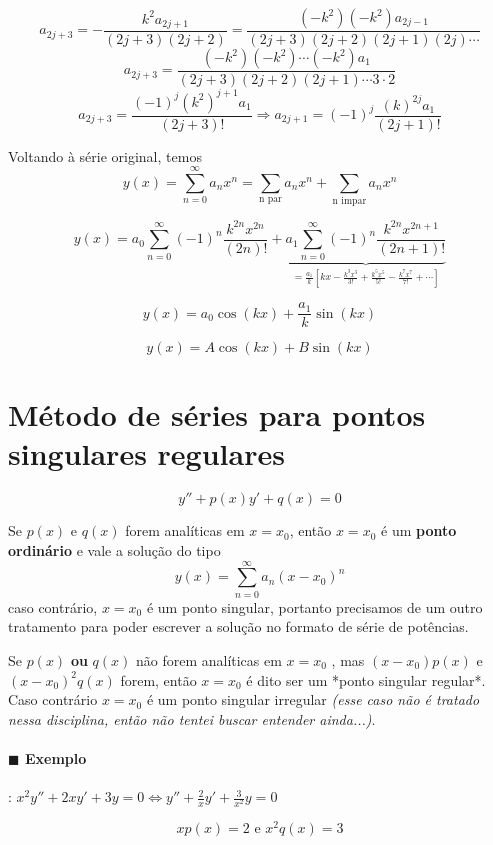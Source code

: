       \[ a_{2j + 3} = - \frac{k^2 a_{2j + 1}}{(2j + 3)(2j + 2)} = \frac{(-k^2)(-k^2) a_{2j-1}}{(2j+3)(2j+2)(2j+1)(2j)\cdots } \]
      \[ a_{2j + 3} =  \frac{(-k^2)(-k^2) \cdots (-k^2) a_1}{(2j+3)(2j+2)(2j+1)\cdots  3 \cdot  2} \]
      \[ a_{2j+3} = \frac{(-1)^j (k^2)^{j + 1} a_1}{(2j + 3)!} \Rightarrow \boxed{ a_{2j + 1} =
      (-1)^{j} \frac{(k)^{2j} a_1}{(2j + 1)!}} \]

    Voltando à série original, temos
    \[ y(x) = \sum_{n = 0}^{\infty} a_n x^n = \sum_{\text{n par}} a_n x^n + \sum_{\text{n impar}}
    a_n x^n \]
    
    \[ y(x) = a_0 \sum_{n = 0}^{\infty} (-1)^n \frac{k^{2n} x^{2n}}{(2n)!} + \underbrace{a_1 \sum_{n =
    0}^{\infty}(-1)^n \frac{k^{2n} x^{2n + 1}}{(2n + 1)!}}_{= \frac{a_1}{k} \left[ kx - \frac{k^3
    x^3}{3!} + \frac{k^5 x^5}{5!} - \frac{k^7 x^7}{7!} + \cdots  \right]} \]

    \[ y(x) = a_0 \cos(kx)  + \frac{a_1}{k} \sin(kx) \]

    \[ \boxed{ y(x) = A \cos(kx) + B \sin (kx) } \]

\section{Método de séries para pontos singulares regulares}



\[ y'' + p(x) y' + q(x) = 0 \]

Se \( p(x) \) e \( q(x) \) forem analíticas em \( x = x_0 \), então \( x = x_0 \) é um \textbf{ponto
ordinário} e vale a solução do tipo
\[ y(x) = \sum_{n = 0}^{\infty} a_n (x - x_0)^n \]
caso contrário, \( x = x_0 \) é um ponto singular, portanto precisamos de um outro tratamento
para poder escrever a solução no formato de série de potências.

Se \( p(x) \) \textbf{ou} \( q(x) \) não forem analíticas em \( x = x_0 \) , mas \( (x - x_0) p(x) \) e \(
(x-x_0)^2 q(x) \) forem, então
\( x = x_0 \) é dito ser um *ponto singular regular*. Caso contrário \( x = x_0 \) é um ponto
singular irregular \emph{(esse caso não é tratado nessa disciplina, então não tentei buscar entender ainda...)}.

  \paragraph{$\blacksquare$ Exemplo}: \( x^2 y'' + 2x y' + 3y = 0 \Leftrightarrow y'' + \frac{2}{x}y ' + \frac{3}{x^2}y = 0 \)

  \[ xp(x) = 2 \text{ e } x^2 q(x) = 3 \]

